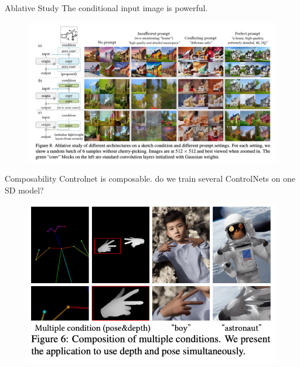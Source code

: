 \documentclass[8pt]{beamer}
\begin{document}
\begin{frame}{Ablative Study}
    \fontsize{7pt}{7pt}\selectfont
    The conditional input image is powerful.
    \begin{figure}
        \includegraphics[scale=0.2]{images/cn_input_variation}
        \label{fig:control_net_training}
    \end{figure}
\end{frame}



\begin{frame}{Composability}
    \fontsize{7pt}{7pt}\selectfont
    Controlnet is composable. do we train several ControlNets on one SD model?
    \begin{figure}
        \includegraphics[scale=0.2]{images/cn_composition}
        \label{fig:control_net_training}
    \end{figure}
\end{frame}
\end{document}
